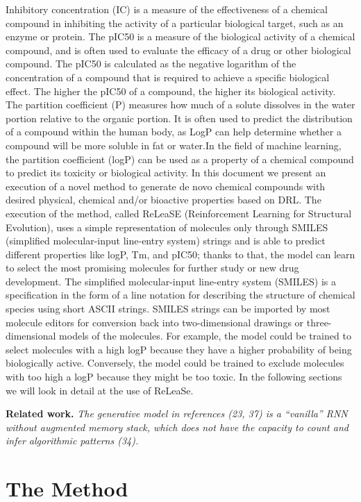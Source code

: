 \documentclass[a4paper]{article}
\newcommand{\mypar}[1]{{\bf #1.}}
\begin{document}
Inhibitory concentration (IC) is a measure of the effectiveness of a chemical compound in inhibiting the activity of a particular biological target, such as an enzyme or protein. The pIC50 is a measure of the biological activity of a chemical compound, and is often used to evaluate the efficacy of a drug or other biological compound. The pIC50 is calculated as the negative logarithm of the concentration of a compound that is required to achieve a specific biological effect. The higher the pIC50 of a compound, the higher its biological activity.
The partition coefficient (P) measures how much of a solute dissolves in the water portion relative to the organic portion. It is often used to predict the distribution of a compound within the human body, as LogP can help determine whether a compound will be more soluble in fat or water.In the field of machine learning, the partition coefficient (logP) can be used as a property of a chemical compound to predict its toxicity or biological activity.
In this document we present an execution of a novel method to generate de novo chemical compounds with desired physical, chemical and/or bioactive properties based on DRL. The execution of the method, called ReLeaSE (Reinforcement Learning for Structural Evolution), uses a simple representation of molecules only through SMILES (simplified molecular-input line-entry system) strings and is able to predict different properties like logP, Tm, and pIC50; thanks to that, the model can learn to select the most promising molecules for further study or new drug development. 
The simplified molecular-input line-entry system (SMILES) is a specification in the form of a line notation for describing the structure of chemical species using short ASCII strings. SMILES strings can be imported by most molecule editors for conversion back into two-dimensional drawings or three-dimensional models of the molecules.
For example, the model could be trained to select molecules with a high logP because they have a higher probability of being biologically active. Conversely, the model could be trained to exclude molecules with too high a logP because they might be too toxic.
In the following sections we will look in detail at the use of ReLeaSe.

\mypar{Related work} 
\textit{The generative
model in references (23, 37) is a “vanilla” RNN without augmented
memory stack, which does not have the capacity to count and infer
algorithmic patterns (34).
}

\section{The Method}\label{sec:The Method}
\end{document}
